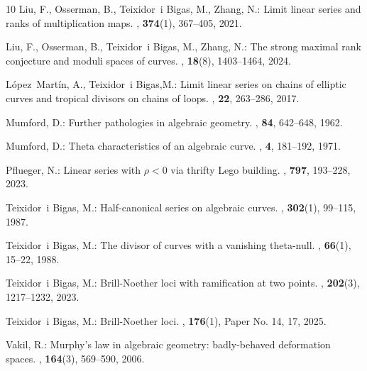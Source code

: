 \documentclass[11pt]{amsart}
\theoremstyle{definition}
\theoremstyle{definition}
\begin{document}
\begin{thebibliography}{10}
	Liu, F., Osserman, B., Teixidor~i Bigas, M., Zhang, N.:
	\newblock Limit linear series and ranks of multiplication maps.
	, \textbf{374}(1), 367--405, 2021.
	
	Liu, F., Osserman, B., Teixidor~i Bigas, M., Zhang, N.:
	\newblock The strong maximal rank conjecture and moduli spaces of curves.
	, \textbf{18}(8), 1403--1464, 2024.
	
	L\'opez~Mart\'in, A., Teixidor~i Bigas,M.:
	\newblock Limit linear series on chains of elliptic curves and tropical
	divisors on chains of loops.
	, \textbf{22}, 263--286, 2017.
	
	Mumford, D.:
	\newblock Further pathologies in algebraic geometry.
	, \textbf{84}, 642--648, 1962.
	
	Mumford, D.:
	\newblock Theta characteristics of an algebraic curve.
	, \textbf{4}, 181--192, 1971.
	
	Pflueger, N.:
	\newblock Linear series with {$\rho<0$} via thrifty {L}ego building.
	, \textbf{797}, 193--228, 2023.
	
	Teixidor~i Bigas, M.:
	\newblock Half-canonical series on algebraic curves.
	, \textbf{302}(1), 99--115, 1987.
	
	Teixidor~i Bigas, M.:
	\newblock The divisor of curves with a vanishing theta-null.
	, \textbf{66}(1), 15--22, 1988.
	
	Teixidor~i Bigas, M.:
	\newblock Brill-{N}oether loci with ramification at two points.
	, \textbf{202}(3), 1217--1232, 2023.
	
	Teixidor~i Bigas, M.:
	\newblock Brill-{N}oether loci.
	, \textbf{176}(1), Paper No. 14, 17, 2025.
	
	Vakil, R.:
	\newblock Murphy's law in algebraic geometry: badly-behaved deformation spaces.
	, \textbf{164}(3), 569--590, 2006.
	
\end{thebibliography}


\vfill
\end{document}
